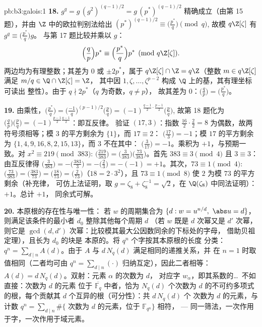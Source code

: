 \begin{solution}{pb:b3:galois:1}
\textbf{18.} $g^q = g\,(g^2)^{(q-1)/2} = g\,(p^*)^{(q-1)/2}$
精确成立（由第 15 题），并由 $\Z$ 中的欧拉判别法给出
$(p^*)^{(q-1)/2} \equiv \bigl(\frac{p^*}q\bigr) \pmod q$,
故模 $q\Z[\zeta]$ 有 $g^q \equiv \bigl(\frac{p^*}q\bigr)g$。
与第 17 题比较并乘以 $g$：
\[
\Bigl(\frac qp\Bigr)p^* \equiv \Bigl(\frac{p^*}q\Bigr)p^*
\pmod{q\Z[\zeta]} .
\]
两边均为有理整数；其差为 $0$ 或
$\pm2p^*$，属于 $q\Z[\zeta] \cap \Z = q\Z$（整数 $m
\in q\Z[\zeta]$ 满足 $m/q \in \Q \cap \Z[\zeta] = \Z$，
其中因 $1, \zeta, \dots, \zeta^{p-2}$ 构成
$\Q$ 上的基，其有理坐标可读出
整性）。由于 $q \nmid 2p^*$（$q$ 为奇数，$q \neq p$），
故其差为 $0$：$\bigl(\frac qp\bigr) =
\bigl(\frac{p^*}q\bigr)$。

\textbf{19.} 由乘性，$\bigl(\frac{p^*}q\bigr) =
\bigl(\frac{-1}q\bigr)^{(p-1)/2}\bigl(\frac pq\bigr) =
(-1)^{\frac{q-1}2\cdot\frac{p-1}2}\bigl(\frac pq\bigr)$,
故第 18 题化为 $\bigl(\frac qp\bigr)\bigl(\frac
pq\bigr) = (-1)^{\frac{p-1}2\frac{q-1}2}$：即互反律。
验证 $(17, 3)$：指数 $\frac{16}2\cdot\frac22 = 8$
为偶数，故两符号须相等；模 $3$ 的平方剩余为 $\{1\}$，而 $17 \equiv 2$：
$\bigl(\frac{17}3\bigr) = -1$；模 $17$ 的平方剩余为 $\{1, 4,
9, 16, 8, 2, 15, 13\}$，而 $3$ 不在其中：
$\bigl(\frac3{17}\bigr) = -1$。乘积为 $+1$，与预期一致。对 $x^2
\equiv 219 \pmod{383}$: $\bigl(\frac{219}{383}\bigr) =
\bigl(\frac3{383}\bigr)\bigl(\frac{73}{383}\bigr)$。首先
$383 \equiv 3 \pmod4$ 且 $3 \equiv 3$：由互反律得
$\bigl(\frac3{383}\bigr) = -\bigl(\frac{383}3\bigr) =
-\bigl(\frac23\bigr) = -(-1) = +1$。其次，$73 \equiv 1
\pmod 4$: $\bigl(\frac{73}{383}\bigr) =
\bigl(\frac{383}{73}\bigr) = \bigl(\frac{18}{73}\bigr) =
\bigl(\frac2{73}\bigr)$（$18 = 2\cdot3^2$），且 $73 \equiv 1
\pmod 8$ 使 $2$ 为模 $73$ 的平方剩余（补充律，
可仿上法证明，取 $g = \zeta_8 + \zeta_8^{-1} = \sqrt2$，在
$\Q(\zeta_8)$ 中同法证明）：$+1$。总计 $+1$，
同余式可解。

\textbf{20.} 本原根的存在性与唯一性：
若 $w$ 的周期集合为 $\{d : w = u^{n/d},\ \abs u = d\}$，
则满足该条件的最小者 $d_0$ 整除其他每个周期 $d$
（若 $w$ 既是 $d$ 次幂又是 $d'$ 次幂，则它是
$\gcd(d, d')$ 次幂：比较模其最大公因数同余的下标处的字母，
借助贝祖定理），且长为 $d_0$ 的块是
本原的。将 $q^n$ 个字按其本原根的长度
分类：$q^n = \sum_{d \mid n}A(d)$。由于 $A$ 与
$d\,N_q(d)$ 满足相同的递推关系，并
在 $n = 1$ 时取值相同（二者均可由 $q^n
= \sum_{d\mid n}(\cdot)$ 归纳互定），因此二者相等：$A(d) =
d\,N_q(d)$。双射：元素 $\alpha$ 的次数为 $d$，
对应字 $w_\alpha$，即其系数的\dots\
不如直接：次数为 $d$ 的元素
位于 $\overline{\mathbb F_q}$ 中者，恰为 $N_q(d)$
个次数为 $d$ 的不可约多项式的根，每个贡献其 $d$
个互异的根（可分性）：共 $d\,N_q(d)$ 个
次数为 $d$ 的元素，与计数 $q^n = \sum_{d\mid n}\#\{
\text{ 次数为 } d \text{ 的元素，位于 } \mathbb F_{q^n}\}$ 相符，
--- 同一筛法，一次作用于字，一次作用于域元素。


\end{solution}
